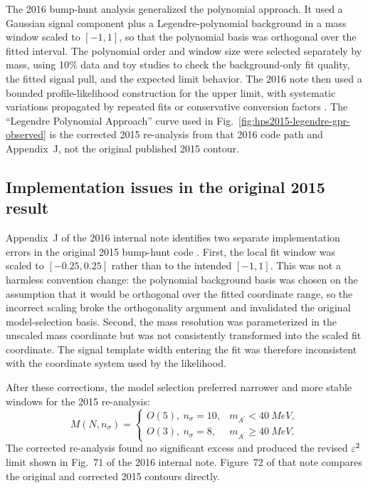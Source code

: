 The 2016 bump-hunt analysis generalized the polynomial approach.  It used a Gaussian
signal component plus a Legendre-polynomial background in a mass window scaled to
$[-1,1]$, so that the polynomial basis was orthogonal over the fitted interval.  The
polynomial order and window size were selected separately by mass, using 10\% data and
toy studies to check the background-only fit quality, the fitted signal pull, and the
expected limit behavior.  The 2016 note then used a bounded profile-likelihood
\CLs{} construction for the upper limit, with systematic variations propagated by
repeated fits or conservative conversion factors \cite{HPS2016BumpInternal}.  The
``Legendre Polynomial Approach'' curve used in Fig.~\ref{fig:hps2015-legendre-gpr-observed}
is the corrected 2015 re-analysis from that 2016 code path and Appendix~J, not the
original published 2015 contour.

\subsection{Implementation issues in the original 2015 result}

Appendix~J of the 2016 internal note identifies two separate implementation errors in
the original 2015 bump-hunt code \cite{HPS2016BumpInternal}.  First, the local fit
window was scaled to $[-0.25,0.25]$ rather than to the intended $[-1,1]$.  This was not
a harmless convention change: the polynomial background basis was chosen on the
assumption that it would be orthogonal over the fitted coordinate range, so the
incorrect scaling broke the orthogonality argument and invalidated the original
model-selection basis.  Second, the mass resolution was parameterized in the unscaled
mass coordinate but was not consistently transformed into the scaled fit coordinate.
The signal template width entering the fit was therefore inconsistent with the
coordinate system used by the likelihood.

After these corrections, the model selection preferred narrower and more stable
windows for the 2015 re-analysis:
\begin{equation}
M(N,n_\sigma)=
\begin{cases}
O(5),~n_\sigma=10, & m_{A^\prime}<\SI{40}{MeV},\\
O(3),~n_\sigma=8, & m_{A^\prime}\ge \SI{40}{MeV}.
\end{cases}
\end{equation}
The corrected re-analysis found no significant excess and produced the revised
$\varepsilon^2$ limit shown in Fig.~71 of the 2016 internal note.  Figure~72 of that note
compares the original and corrected 2015 contours directly.

